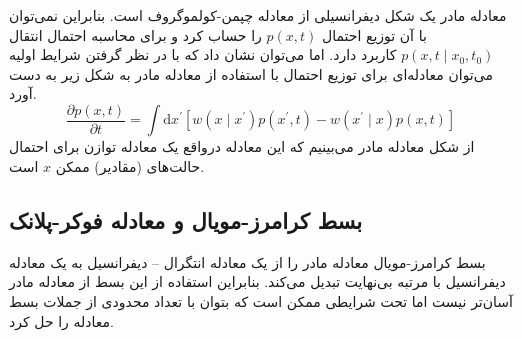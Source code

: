 معادله مادر یک شکل دیفرانسیلی از معادله چپمن-کولموگروف است. بنابراین نمی‌توان با آن توزیع احتمال $p\left( x, t \right)$ را حساب کرد و برای محاسبه احتمال انتقال $p\left( x,t \mid x_{0},t_{0} \right)$ کاربرد دارد. اما می‌توان نشان داد که با در نظر گرفتن شرایط اولیه می‌توان معادله‌ای برای توزیع احتمال با استفاده از معادله مادر به شکل زیر به دست آورد.\cite{2007cond.mat..1242G}
\begin{equation}
  \frac{\partial p(x, t)}{\partial t}=\int \mathrm{d} x^{\prime}\left[w\left(x \mid x^{\prime}\right) p\left(x^{\prime}, t\right)-w\left(x^{\prime} \mid x\right) p(x, t)\right]
  \label{master_equation}
\end{equation}
از شکل معادله مادر می‌بینیم که این معادله در‌واقع یک معادله توازن برای احتمال حالت‌های (مقادیر) ممکن $x$ است.

\subsection{بسط کرامرز-مویال و معادله فوکر-پلانک}

بسط کرامرز-مویال معادله مادر را از یک معادله انتگرال – دیفرانسیل به یک معادله دیفرانسیل با مرتبه بی‌نهایت تبدیل می‌کند. بنابراین استفاده از این بسط از معادله مادر آسان‌تر نیست اما تحت شرایطی ممکن است که بتوان با تعداد محدودی از جملات بسط معادله را حل کرد.\cite{kramers_brownian_1940}

